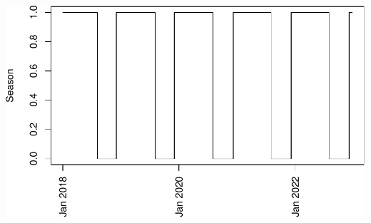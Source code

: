 \documentclass[
]{article}
\begin{document}
\includegraphics{habmodel_files/figure-latex/unnamed-chunk-7-1.pdf}
\end{document}
